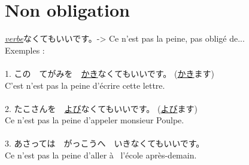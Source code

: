 \documentclass[11pt]{report}
\newenvironment{Japanese}{%
\CJKfamily{min}%
\CJKtilde  
\CJKnospace}{}
\begin{document}
\section{Non obligation}

\begin{CJK}{UTF8}{}  
\begin{Japanese}
	\underline{\emph{verbe}}なくてもいいです。-> Ce n'est pas la peine, pas obligé de... \\
	
	Exemples : \\ \\
	1. この　てがみを　\underline{かき}なくてもいいです。 (\underline{かき}ます) \\
	C'est n'est pas la peine d'écrire cette lettre. \\ \\
	2. たこさんを　\underline{よび}なくてもいいです。 (\underline{よび}ます) \\
	Ce n'est pas la peine d'appeler monsieur Poulpe. \\ \\
	3. あさっては　がっこうへ　いきなくてもいいです。 \\
	Ce n'est pas la peine d'aller à \, l'école après-demain.
\end{Japanese}  
\end{CJK}
\end{document}

